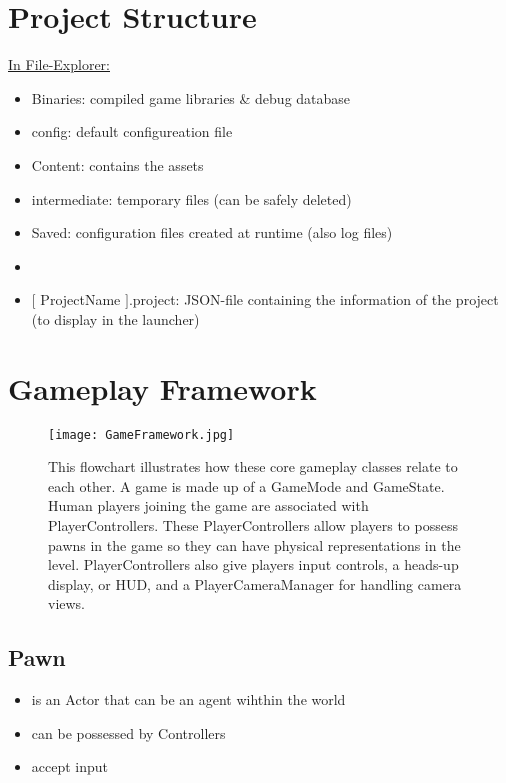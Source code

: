 \documentclass{scrbook}
\begin{document}
        \section{Project Structure}
        \underline{In File-Explorer:}
        \begin{itemize}
            \item Binaries: compiled game libraries \& debug database
            \item config: default configureation file
            \item Content: contains the assets
            \item intermediate: temporary files (can be safely deleted)
            \item Saved: configuration files created at runtime (also log files)
            \item 
            \item $[$ ProjectName $]$.project: JSON-file containing the information of the project (to display in the launcher)
        \end{itemize}

        \section{Gameplay Framework}
             \begin{figure}[ht]
                \texttt{[image: GameFramework.jpg]}
                \caption{This flowchart illustrates how these core gameplay classes relate to each other.
                A game is made up of a GameMode and GameState. Human players joining the game are associated
                with PlayerControllers. These PlayerControllers allow players to possess pawns in the game
                so they can have physical representations in the level. PlayerControllers also give players
                input controls, a heads-up display, or HUD, and a PlayerCameraManager for handling camera views. }
             \end{figure}

            \subsection{Pawn}
                \begin{itemize}
                    \item is an Actor that can be an agent wihthin the world
                    \item can be possessed by Controllers
                    \item accept input
                \end{itemize}
\end{document}
